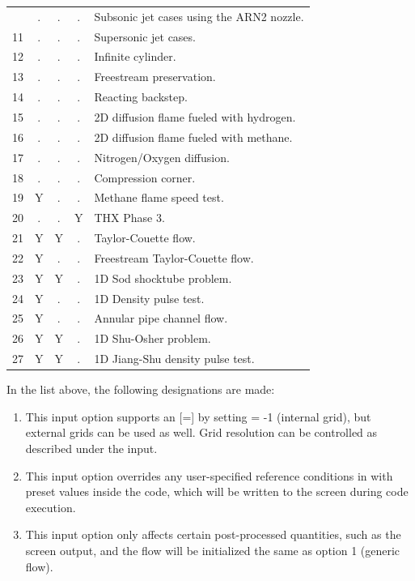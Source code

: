 \begin{nmldescbody}
\begin{longtable}{ @{} r c c c l @{} }
                    \nopagebreak
  -10 & . & . & . & Subsonic jet cases using the ARN2 nozzle.\\
   11 & . & . & . & Supersonic jet cases.\\
   12 & . & . & . & Infinite cylinder.\\
   13 & . & . & . & Freestream preservation.\\
   14 & . & . & . & Reacting backstep.\\
   15 & . & . & . & 2D diffusion flame fueled with hydrogen.\\
   16 & . & . & . & 2D diffusion flame fueled with methane.\\
   17 & . & . & . & Nitrogen\slash Oxygen diffusion.\\
   18 & . & . & . & Compression corner.\\
   19 & Y & . & . & Methane flame speed test.\\
   20 & . & . & Y & THX Phase 3.\\
   21 & Y & Y & . & Taylor-Couette flow.\\
   22 & Y & . & . & Freestream Taylor-Couette flow.\\
   23 & Y & Y & . & 1D Sod shocktube problem.\\
   24 & Y & . & . & 1D Density pulse test.\\
   25 & Y & . & . & Annular pipe channel flow.\\
   26 & Y & Y & . & 1D Shu-Osher problem.\\
   27 & Y & Y & . & 1D Jiang-Shu density pulse test.\\
   \bottomrule
\end{longtable}
\endgroup

\noindent
In the list above, the following designations are made:
\begin{enumerate}[align=parleft]
\item[IG]
This input option supports an
[=]
by setting  = -1 (internal grid),
but external grids can be used as well.
Grid resolution can be controlled as described under the
 input.
\item[RC]
This input option overrides any user-specified reference conditions
in  with preset values inside the code,
which will be written to the screen during code execution.
\item[PP]
This input option only affects certain post-processed quantities,
such as the screen output,
and the flow will be initialized the same as option 1 (generic flow).
\end{enumerate}


\end{nmldescbody}

